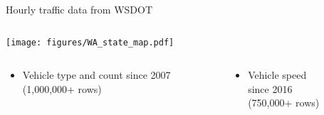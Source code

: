 \documentclass{beamer}
\begin{document}
\begin{frame}[plain]
	\vspace{0.3em}
	\begin{columns}
		\begin{column}{0.95\textwidth}
			{\Large{Hourly traffic data from WSDOT}}
		\end{column}
	\end{columns}
	\vspace{0.2em}
	\texttt{[image: figures/WA\_state\_map.pdf]}
	\vspace{-0.5em}
		\begin{columns}
		\begin{column}{0.4\textwidth}
			\large{\begin{itemize}
				\item Vehicle type and count since 2007 \\ {\normalsize{(1,000,000+ rows)}}
			\end{itemize}}
		\end{column}
		\begin{column}{0.4\textwidth}
			\large{\begin{itemize}
				\item Vehicle speed \\ since 2016 \\ {\normalsize{(750,000+ rows)}}
			\end{itemize}}
		\end{column}
	\end{columns}
\end{frame}
\end{document}
